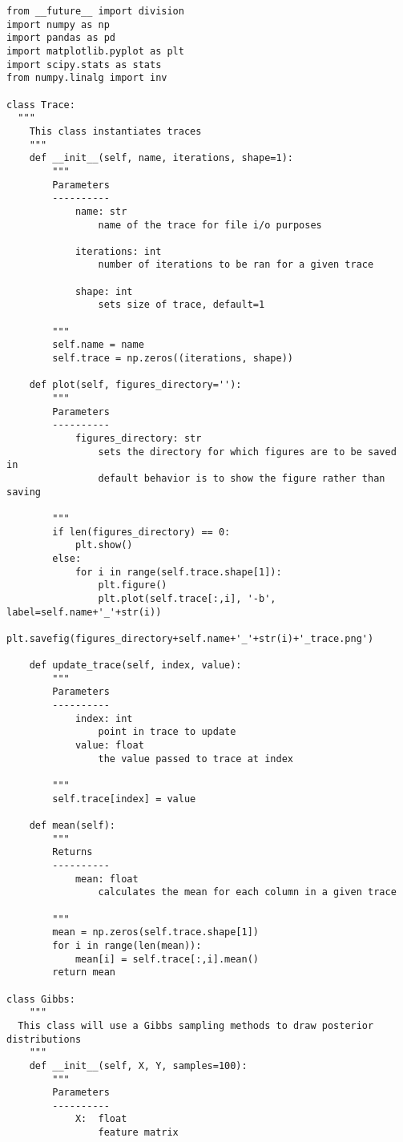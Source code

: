 \documentclass[10pt]{article}
\begin{document}
    \begin{lstlisting}
from __future__ import division
import numpy as np 
import pandas as pd
import matplotlib.pyplot as plt
import scipy.stats as stats
from numpy.linalg import inv

class Trace:
  """
    This class instantiates traces
    """
    def __init__(self, name, iterations, shape=1):
        """
        Parameters
        ----------
            name: str
                name of the trace for file i/o purposes

            iterations: int
                number of iterations to be ran for a given trace

            shape: int
                sets size of trace, default=1

        """
        self.name = name
        self.trace = np.zeros((iterations, shape))

    def plot(self, figures_directory=''):
        """
        Parameters
        ----------
            figures_directory: str
                sets the directory for which figures are to be saved in
                default behavior is to show the figure rather than saving

        """
        if len(figures_directory) == 0:
            plt.show()
        else:
            for i in range(self.trace.shape[1]):
                plt.figure()
                plt.plot(self.trace[:,i], '-b', label=self.name+'_'+str(i))
                plt.savefig(figures_directory+self.name+'_'+str(i)+'_trace.png')

    def update_trace(self, index, value):
        """
        Parameters
        ----------
            index: int
                point in trace to update
            value: float
                the value passed to trace at index

        """
        self.trace[index] = value

    def mean(self):
        """
        Returns
        ----------
            mean: float
                calculates the mean for each column in a given trace

        """
        mean = np.zeros(self.trace.shape[1])
        for i in range(len(mean)):
            mean[i] = self.trace[:,i].mean()
        return mean

class Gibbs:
    """
  This class will use a Gibbs sampling methods to draw posterior distributions
    """
    def __init__(self, X, Y, samples=100):
        """
        Parameters
        ----------
            X:  float
                feature matrix


\end{lstlisting}
\end{document}

